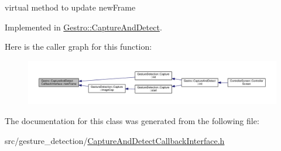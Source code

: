 virtual method to update new\+Frame 



Implemented in \hyperlink{class_gestro_1_1_capture_and_detect_a7f18d1c58b2ae4241766b36aa27385e9}{Gestro\+::\+Capture\+And\+Detect}.

Here is the caller graph for this function\+:
\nopagebreak
\begin{figure}[H]
\begin{center}
\leavevmode
\includegraphics[width=350pt]{class_gestro_1_1_capture_and_detect_callback_interface_a9a42d0f1b3fd64cea607eeb4e6a46287_icgraph}
\end{center}
\end{figure}


The documentation for this class was generated from the following file\+:\begin{DoxyCompactItemize}
\item 
src/gesture\+\_\+detection/\hyperlink{_capture_and_detect_callback_interface_8h}{Capture\+And\+Detect\+Callback\+Interface.\+h}\end{DoxyCompactItemize}
